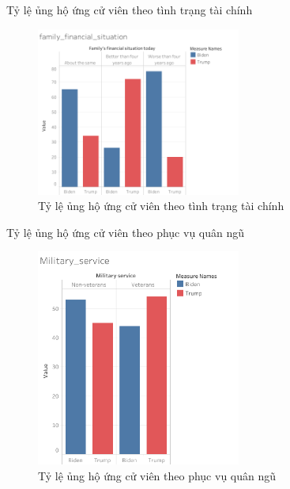 \documentclass[10pt]{beamer}
\theoremstyle{remark}
\theoremstyle{definition}
\begin{document}
\begin{frame}{Tỷ lệ ủng hộ ứng cử viên theo tình trạng tài chính}
	\begin{figure}[h!]
        \centering
        \includegraphics[width=0.6\textwidth]{figures/family_financial_situation.png}
        \caption{Tỷ lệ ủng hộ ứng cử viên theo tình trạng tài chính}
    \end{figure}
\end{frame}

\begin{frame}{Tỷ lệ ủng hộ ứng cử viên theo phục vụ quân ngũ}
	\begin{figure}[h!]
        \centering
        \includegraphics[width=0.6\textwidth]{figures/Military_service.png}
        \caption{Tỷ lệ ủng hộ ứng cử viên theo phục vụ quân ngũ}
    \end{figure}
\end{frame}
\end{document}
